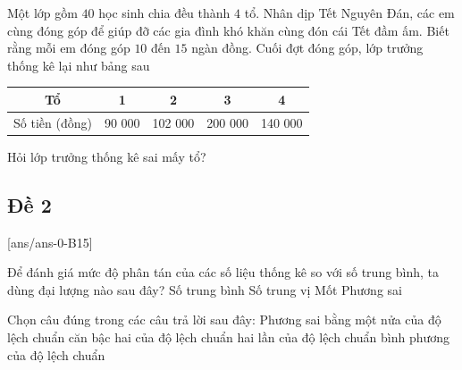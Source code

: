 \begin{ex}%
Một lớp gồm $40$ học sinh chia đều thành $4$ tổ. Nhân dịp Tết Nguyên Đán, các em cùng đóng góp để giúp đỡ các gia đình khó khăn cùng đón cái Tết đầm ấm. Biết rằng mỗi em đóng góp $10$ đến $15$ ngàn đồng. Cuối đợt đóng góp, lớp trưởng thống kê lại như bảng sau 
\begin{center}
\begin{tabular}{|c|c|c|c|c|}
\hline Tổ& 1 & 2 & 3 & 4 \\
\hline Số tiền (đồng) & 90 000 & 102 000 & 200 000 & 140 000 \\
\hline
\end{tabular}
\end{center}
Hỏi lớp trưởng thống kê sai mấy tổ?
\end{ex}
\subsection{Đề 2}
[ans/ans-0-B15]
\caulc
\begin{ex}%
	Để đánh giá mức độ phân tán của các số liệu thống kê so với số trung bình, ta dùng đại lượng nào sau đây?
	\choice
	{Số trung bình}
	{Số trung vị}
	{Mốt}
	{\True Phương sai}
\end{ex}	

\begin{ex}%
	Chọn câu đúng trong các câu trả lời sau đây: Phương sai bằng
	\choice
	{một nửa của độ lệch chuẩn}
	{căn bậc hai của độ lệch chuẩn}
	{hai lần của độ lệch chuẩn}
	{\True bình phương của độ lệch chuẩn}
\end{ex}	

